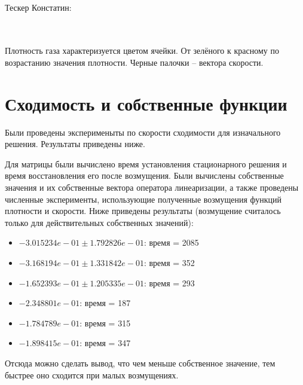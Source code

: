 \documentclass[a4paper, 25pt]{article}
\begin{document}
\\
Тескер Констатин:
\begin{figure}[h!]
\end{figure}
\\
\\
Плотность газа характеризуется цветом ячейки. От зелёного к красному по возрастанию значения плотности. Черные палочки -- вектора скорости.

\newpage
\section{Сходимость и собственные функции}
Были проведены эксперименыты по скорости сходимости для изначального решения. Результаты приведены ниже.

Для матрицы были вычислено время установления стационарного решения и время восстановления его после возмущения. Были вычислены собственные значения
и их собственные вектора оператора линеаризации, а также проведены численные эксперименты, использующие полученные возмущения функций плотности и 
скорости. Ниже приведены результаты (возмущение считалось только для действительных собственных значений):
\begin{itemize}
 \item $-3.015234e-01 \pm 1.792826e-01$: время = 2085
 \item $-3.168194e-01 \pm 1.331842e-01$: время = 352
 \item $-1.652393e-01 \pm 1.205335e-01$: время = 293
 \item $-2.348801e-01$: время = 187
 \item $-1.784789e-01$: время = 315
 \item $-1.898415e-01$: время = 347 
\end{itemize}
Отсюда можно сделать вывод, что чем меньше собственное значение, тем быстрее оно сходится при малых возмущениях.
\end{document}
